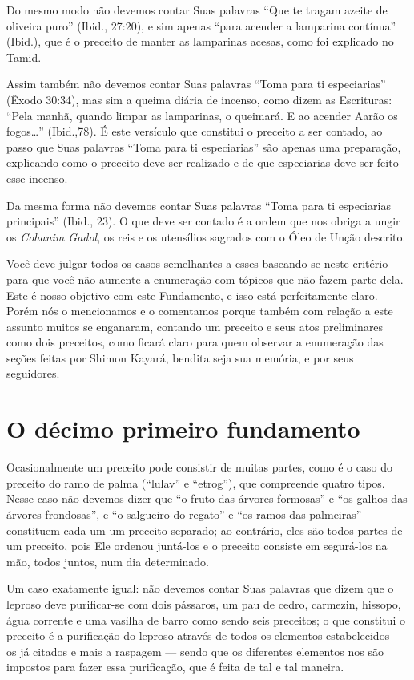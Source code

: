 Do mesmo modo não devemos contar Suas palavras ``Que te tragam azeite de
oliveira puro'' (Ibid., 27:20), e sim apenas ``para acender a lamparina
contínua'' (Ibid.), que é o preceito de manter as lamparinas acesas,
como foi explicado no Tamid.

Assim também não devemos contar Suas palavras ``Toma para ti
especiarias'' (Êxodo 30:34), mas sim a queima diária de incenso, como
dizem as Escrituras: ``Pela manhã, quando limpar as lamparinas, o
queimará. E ao acender Aarão os fogos\ldots{}'' (Ibid.,78). É este versículo que constitui o
preceito a ser contado, ao passo que Suas palavras ``Toma para ti
especiarias'' são apenas uma preparação, explicando como o preceito deve
ser realizado e de que especiarias deve ser feito esse incenso.

Da mesma forma não devemos contar Suas palavras ``Toma para ti
especiarias principais'' (Ibid., 23). O que deve ser contado é a ordem
que nos obriga a ungir os \textit{Cohanim Gadol}, os reis e os utensílios
sagrados com o Óleo de Unção descrito.

Você deve julgar todos os casos semelhantes a esses baseando-se neste
critério para que você não aumente a enumeração com tópicos que não
fazem parte dela. Este é nosso objetivo com este Fundamento, e isso está
perfeitamente claro. Porém nós o mencionamos e o comentamos porque
também com relação a este assunto muitos se enganaram, contando um
preceito e seus atos preliminares como dois preceitos, como ficará
claro para quem observar a enumeração das seções feitas por Shimon
Kayará, bendita seja sua memória, e por seus seguidores.

\chapter*{O décimo primeiro fundamento}

Ocasionalmente um preceito pode consistir de muitas partes, como é o
caso do preceito do ramo de palma (``lulav'' e ``etrog''), que
compreende quatro tipos. Nesse caso não devemos dizer que ``o fruto das
árvores formosas'' e ``os galhos das árvores frondosas'', e ``o
salgueiro do regato'' e ``os ramos das palmeiras'' constituem cada um
um preceito separado; ao contrário, eles são todos partes de um
preceito, pois Ele ordenou juntá-los e o preceito consiste em segurá-los
na mão, todos juntos, num dia determinado.

Um caso exatamente igual: não devemos contar Suas palavras que dizem que
o leproso deve purificar-se com dois pássaros, um pau de cedro,
carmezin, hissopo, água corrente e uma vasilha de barro como sendo seis
preceitos; o que constitui o preceito é a purificação do leproso
através de todos os elementos estabelecidos --- os já citados e mais a
raspagem --- sendo que os diferentes elementos nos são impostos para
fazer essa purificação, que é feita de tal e tal maneira.


